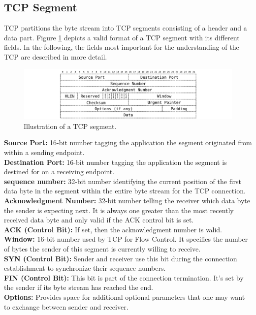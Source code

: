 \subsection*{TCP Segment}

TCP partitions the byte stream into TCP segments consisting of a header and a data part. Figure \ref{fig:TCPSegment} depicts a valid format of a TCP segment with its different fields. In the following, the fields most important for the understanding of the TCP are described in more detail. 

\begin{figure} [H]
	\begin{center}
		\def\svgwidth{1\textwidth}
		\includegraphics[scale=0.2]{../illustrations/importantConcepts/TCPSegment.pdf}  
		\caption[Caption for the list of figures.]{Illustration of a TCP segment.}
		\label{fig:TCPSegment}
	\end{center}
\end{figure}

{\small \textbf{Source Port:} 16-bit number tagging the application the segment originated from within a sending endpoint. \smallskip\\
\textbf{Destination Port:} 16-bit number tagging the application the segment is destined for on a receiving endpoint. \smallskip\\
\textbf{sequence number:} 32-bit number identifying the current position of the first data byte in the segment within the entire byte stream for the TCP connection. \smallskip\\
\textbf{Acknowledgment Number:} 32-bit number telling the receiver which data byte the sender is expecting next. It is always one greater than the most recently received data byte and only valid if the ACK control bit is set. \smallskip\\
\textbf{ACK (Control Bit):} If set, then the acknowledgment number is valid. \smallskip\\
\textbf{Window:} 16-bit number used by TCP for Flow Control. It specifies the number of bytes the sender of this segment is currently willing to receive. \smallskip\\
\textbf{SYN (Control Bit):} Sender and receiver use this bit during the connection establishment to synchronize their sequence numbers.  \smallskip\\
\textbf{FIN (Control Bit):} This bit is part of the connection termination. It's set by the sender if its byte stream has reached the end. \smallskip\\
\textbf{Options:} Provides space for additional optional parameters that one may want to exchange between sender and receiver. 
}
 
